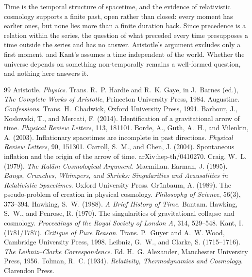 \documentclass{situationist-preprint}
\begin{document}
Time is the temporal structure of spacetime, and the evidence of relativistic cosmology supports a finite past, open rather than closed: every moment has earlier ones, but none lies more than a finite duration back. Since precedence is a relation within the series, the question of what preceded every time presupposes a time outside the series and has no answer. Aristotle's argument excludes only a first moment, and Kant's assumes a time independent of the world. Whether the universe depends on something non-temporally remains a well-formed question, and nothing here answers it.

\begin{thebibliography}{99}\small
{} Aristotle. \emph{Physics}. Trans. R.~P. Hardie and R.~K. Gaye, in J.~Barnes (ed.), \emph{The Complete Works of Aristotle}, Princeton University Press, 1984.
 Augustine. \emph{Confessions}. Trans. H.~Chadwick, Oxford University Press, 1991.
 Barbour, J., Koslowski, T., and Mercati, F. (2014). Identification of a gravitational arrow of time. \emph{Physical Review Letters}, 113, 181101.
 Borde, A., Guth, A.~H., and Vilenkin, A. (2003). Inflationary spacetimes are incomplete in past directions. \emph{Physical Review Letters}, 90, 151301.
 Carroll, S.~M., and Chen, J. (2004). Spontaneous inflation and the origin of the arrow of time. arXiv:hep-th/0410270.
 Craig, W.~L. (1979). \emph{The Kal\=am Cosmological Argument}. Macmillan.
 Earman, J. (1995). \emph{Bangs, Crunches, Whimpers, and Shrieks: Singularities and Acausalities in Relativistic Spacetimes}. Oxford University Press.
 Gr\"unbaum, A. (1989). The pseudo-problem of creation in physical cosmology. \emph{Philosophy of Science}, 56(3), 373--394.
 Hawking, S.~W. (1988). \emph{A Brief History of Time}. Bantam.
 Hawking, S.~W., and Penrose, R. (1970). The singularities of gravitational collapse and cosmology. \emph{Proceedings of the Royal Society of London A}, 314, 529--548.
 Kant, I. (1781/1787). \emph{Critique of Pure Reason}. Trans. P.~Guyer and A.~W. Wood, Cambridge University Press, 1998.
 Leibniz, G.~W., and Clarke, S. (1715--1716). \emph{The Leibniz--Clarke Correspondence}. Ed. H.~G. Alexander, Manchester University Press, 1956.
 Tolman, R.~C. (1934). \emph{Relativity, Thermodynamics and Cosmology}. Clarendon Press.
\end{thebibliography}
\end{document}
